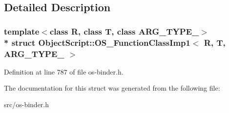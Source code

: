 \subsection{Detailed Description}
\subsubsection*{template$<$class R, class T, class A\+R\+G\+\_\+\+T\+Y\+P\+E\+\_$>$\\*
struct Object\+Script\+::\+O\+S\+\_\+\+Function\+Class\+Imp1$<$ R, T, A\+R\+G\+\_\+\+T\+Y\+P\+E\+\_ $>$}



Definition at line 787 of file os-\/binder.\+h.



The documentation for this struct was generated from the following file\+:\begin{DoxyCompactItemize}
\item 
src/os-\/binder.\+h\end{DoxyCompactItemize}

